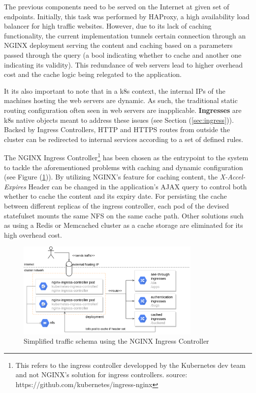 \documentclass[11pt]{article}
\begin{document}
\hspace{5mm} The previous components need to be served on the Internet at given set of endpoints. Initially, this task was performed by HAProxy, a high availability load balancer for high traffic websites. However, due to its lack of caching functionality, the current implementation tunnels certain connection through an NGINX deployment serving the content and caching based on a parameters passed through the query (a bool indicating whether to cache and another one indicating its validity). This redundance of web servers lead to higher overhead cost and the cache logic being relegated to the application. 

It its also important to note that in a k8s context, the internal IPs of the machines hosting the web servers are dynamic. As such, the traditional static routing configuration often seen in web servers are inapplicable. \textbf{Ingresses} are k8s native objects meant to address these issues (see Section (\ref{sec:ingress})). Backed by Ingress Controllers, HTTP and HTTPS routes from outside the cluster can be redirected to internal services according to a set of defined rules. 

The NGINX Ingress Controller\footnote{This refers to the ingress controller developped by the Kubernetes dev team and not NGINX's solution for ingress controllers. source: https://github.com/kubernetes/ingress-nginx} has been chosen as the entrypoint to the system to tackle the aforementioned problems with caching and dynamic configuration (see Figure (\ref{fig:vulas_admin})). By utilizing NGINX's feature for caching content, the \textit{X-Accel-Expires} Header can be changed in the application's AJAX query to control both whether to cache the content and its expiry date. For persisting the cache between different replicas of the ingress controller, each pod of the devised statefulset mounts the same NFS on the same cache path. Other solutions such as using a Redis or Memcached cluster as a cache storage are eliminated for its high overhead cost. 

\begin{figure}[h]
    \centering
    \includegraphics[width=0.8\textwidth]{vulas_admin.png}
    \caption{Simplified traffic schema using the NGINX Ingress Controller}
    \label{fig:vulas_admin}
\end{figure}
\end{document}
